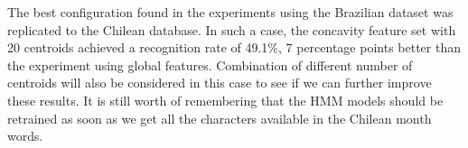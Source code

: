 \documentclass{article}[14pt, oneside, a4paper, times]
\begin{document}
The best configuration found in the experiments using the Brazilian dataset was replicated to the Chilean database. In such a case, the concavity feature set with 20 centroids achieved a recognition rate of 49.1\%, 7 percentage points better than the experiment using global features. Combination of different number of centroids will also be considered in this case to see if  we can further improve these results. It is still worth of remembering that the HMM models should be retrained as soon as we get all the characters available in the Chilean month words. 

 





\end{document}
